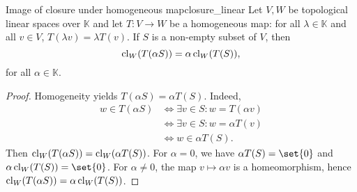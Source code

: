 \begin{proposition}{Image of closure under homogeneous map}{closure_linear}
    Let \(V,W\) be topological linear spaces over \(\mathbb{K}\) and let \(T : V \to W\) be a homogeneous map: for all \(\lambda \in \mathbb{K}\) and all \(v \in V\), \(T(\lambda v) = \lambda T(v)\). If \(S\) is a non-empty subset of \(V\), then
    \begin{equation*}
        \operatorname{cl}_W(T(\alpha S)) = \alpha \operatorname{cl}_W(T(S)),
    \end{equation*}
    for all \(\alpha \in \mathbb{K}\).
\end{proposition}
\begin{proof}
    Homogeneity yields \(T(\alpha S) = \alpha T(S)\). Indeed,
    \begin{align*}
        w \in T(\alpha S) &\iff \exists v \in S : w = T(\alpha v)\\
                          &\iff \exists v \in S : w = \alpha T(v)\\
                          &\iff w \in \alpha T(S).
    \end{align*}
    Then \(\operatorname{cl}_W(T(\alpha S)) = \operatorname{cl}_W(\alpha T(S))\). For \(\alpha = 0\), we have \(\alpha T(S) = \set{0}\) and \(\alpha \cl_W(T(S)) = \set{0}\). For \(\alpha \neq 0\), the map \(v \mapsto \alpha v\) is a homeomorphism, hence \(\operatorname{cl}_W(T(\alpha S)) = \alpha \operatorname{cl}_W(T(S))\).
\end{proof}
